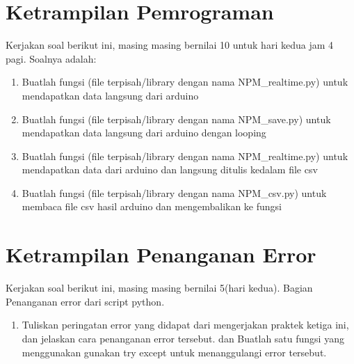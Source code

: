 \section{Ketrampilan Pemrograman}
Kerjakan soal berikut ini, masing masing bernilai 10 untuk hari kedua jam 4 pagi. Soalnya adalah:

\begin{enumerate}
\item
Buatlah fungsi (file terpisah/library dengan nama NPM\_realtime.py) untuk mendapatkan data langsung dari arduino
\item
Buatlah fungsi (file terpisah/library dengan nama NPM\_save.py) untuk mendapatkan data langsung dari arduino dengan looping
\item
Buatlah fungsi (file terpisah/library dengan nama NPM\_realtime.py) untuk mendapatkan data dari arduino dan langsung ditulis kedalam file csv
\item
Buatlah fungsi (file terpisah/library dengan nama NPM\_csv.py) untuk membaca file csv hasil arduino dan mengembalikan ke fungsi
\end{enumerate}




\section{Ketrampilan Penanganan Error}
Kerjakan soal berikut ini, masing masing bernilai 5(hari kedua). Bagian Penanganan error dari script python.
\begin{enumerate}
\item
Tuliskan peringatan error yang didapat dari mengerjakan praktek ketiga ini, dan jelaskan cara penanganan error tersebut.
dan Buatlah satu fungsi yang menggunakan gunakan try except untuk menanggulangi error tersebut.
\end{enumerate}



